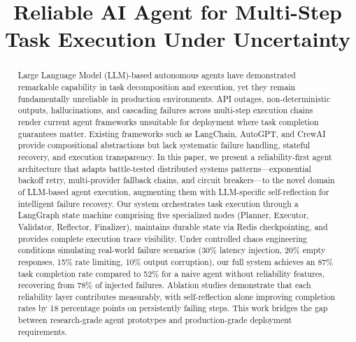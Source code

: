 \documentclass[conference]{IEEEtran}
\begin{document}
\title{Reliable AI Agent for Multi-Step Task Execution Under Uncertainty}

\author{
}

\maketitle

\begin{abstract}
Large Language Model (LLM)-based autonomous agents have demonstrated remarkable capability in task decomposition and execution, yet they remain fundamentally unreliable in production environments. API outages, non-deterministic outputs, hallucinations, and cascading failures across multi-step execution chains render current agent frameworks unsuitable for deployment where task completion guarantees matter. Existing frameworks such as LangChain, AutoGPT, and CrewAI provide compositional abstractions but lack systematic failure handling, stateful recovery, and execution transparency. In this paper, we present a reliability-first agent architecture that adapts battle-tested distributed systems patterns---exponential backoff retry, multi-provider fallback chains, and circuit breakers---to the novel domain of LLM-based agent execution, augmenting them with LLM-specific self-reflection for intelligent failure recovery. Our system orchestrates task execution through a LangGraph state machine comprising five specialized nodes (Planner, Executor, Validator, Reflector, Finalizer), maintains durable state via Redis checkpointing, and provides complete execution trace visibility. Under controlled chaos engineering conditions simulating real-world failure scenarios (30\% latency injection, 20\% empty responses, 15\% rate limiting, 10\% output corruption), our full system achieves an 87\% task completion rate compared to 52\% for a naive agent without reliability features, recovering from 78\% of injected failures. Ablation studies demonstrate that each reliability layer contributes measurably, with self-reflection alone improving completion rates by 18 percentage points on persistently failing steps. This work bridges the gap between research-grade agent prototypes and production-grade deployment requirements.
\end{abstract}
\end{document}
